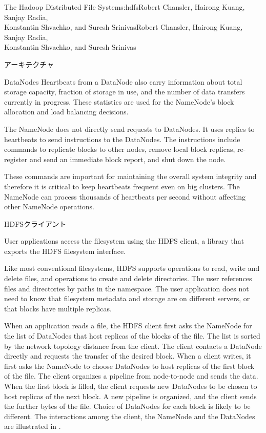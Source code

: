 \begin{aosachaptertoc}{The Hadoop Distributed File System}{s:hdfs}{Robert Chansler, Hairong Kuang, Sanjay Radia, \\ Konstantin Shvachko, and Suresh Srinivas}{Robert Chansler, Hairong Kuang, Sanjay Radia, \\ \hspace*{0.9cm} Konstantin Shvachko, and Suresh Srinivas}
\begin{aosasect1}{アーキテクチャ}
\begin{aosasect2}{DataNodes}
Heartbeats from a DataNode also carry information about total storage
capacity, fraction of storage in use, and the number of data transfers
currently in progress. These statistics are used for the NameNode's
block allocation and load balancing decisions.

The NameNode does not directly send requests to DataNodes. It uses
replies to heartbeats to send instructions to the DataNodes.  The
instructions include commands to replicate blocks to other nodes,
remove local block replicas, re-register and send an immediate block
report, and shut down the node.

These commands are important for maintaining the overall system
integrity and therefore it is critical to keep heartbeats frequent
even on big clusters. The NameNode can process thousands of heartbeats
per second without affecting other NameNode operations.

\end{aosasect2}

\begin{aosasect2}{HDFSクライアント}

User applications access the filesystem using the HDFS client, a
library that exports the HDFS filesystem interface.

Like most conventional filesystems, HDFS supports operations to read,
write and delete files, and operations to create and delete
directories. The user references files and directories by paths in the
namespace. The user application does not need to know that filesystem
metadata and storage are on different servers, or that blocks have
multiple replicas.

When an application reads a file, the HDFS client first asks the
NameNode for the list of DataNodes that host replicas of the blocks of
the file. The list is sorted by the network topology distance from the client. The client
contacts a DataNode directly and requests the
transfer of the desired block. When a client writes, it first asks the
NameNode to choose DataNodes to host replicas of the first block of
the file. The client organizes a pipeline from node-to-node and sends
the data. When the first block is filled, the client requests new
DataNodes to be chosen to host replicas of the next block. A new
pipeline is organized, and the client sends the further bytes of the
file. Choice of DataNodes for each block is likely to be
different. The interactions among the client, the NameNode and the
DataNodes are illustrated in .


\end{aosasect2}
\end{aosasect1}
\end{aosachaptertoc}
